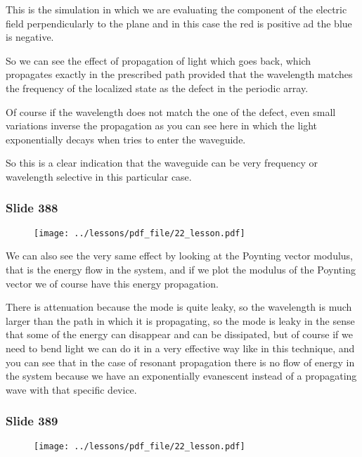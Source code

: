 \documentclass[../main/main.tex]{subfiles}
\begin{document}
This is the simulation in which we are evaluating the component of the electric field perpendicularly to the plane and in this case the red is positive ad the blue is negative.

So we can see the effect of propagation of light which goes back, which propagates exactly in the prescribed path provided that the wavelength matches the frequency of the localized state as the defect in the periodic array. 

Of course if the wavelength does not match the one of the defect, even small variations inverse the propagation as you can see here in which the light exponentially decays when tries to enter the waveguide. 

So this is a clear indication that the waveguide can be very frequency or wavelength selective in this particular case.

\newpage

\subsubsection{Slide 388}

\begin{figure}[h!]
\centering
\texttt{[image: ../lessons/pdf\_file/22\_lesson.pdf]}
\end{figure}

We can also see the very same effect by looking at the Poynting vector modulus, that is the energy flow in the system, and if we plot the modulus of the Poynting vector we of course have this energy propagation. 

There is attenuation because the mode is quite leaky, so the wavelength is much larger than the path in which it is propagating, so the mode is leaky in the sense that some of the energy can disappear and can be dissipated, but of course if we need to bend light we can do it in a very effective way like in this technique, and you can see that in the case of resonant propagation there is no flow of energy in the system because we have an exponentially evanescent instead of a propagating wave with that specific device.

\newpage

\subsubsection{Slide 389}

\begin{figure}[h!]
\centering
\texttt{[image: ../lessons/pdf\_file/22\_lesson.pdf]}
\end{figure}
\end{document}
